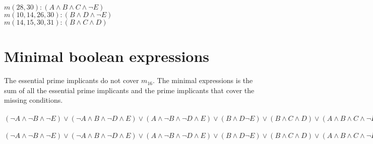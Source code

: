 \documentclass{article}
\begin{document}
    $m(28,30) : (A \land B  \land C \land \neg E)$\\

    $m(10, 14, 26, 30) : (B \land D \land \neg E)$\\
    
    $m(14, 15, 30, 31) : (B \land C \land D)$\\

    \section{\textbf{Minimal boolean expressions}}
    
    The  essential prime implicants do not cover $m_{16}$. The minimal expressions is the sum of all the essential prime implicants and the prime implicants that cover the missing conditions.\\
	\\
    $(\neg A \land \neg B \land \neg E) \lor (\neg A \land B \land \neg D \land E) \lor (A \land \neg B \land \neg D \land E) \lor (B \land D \neg E) \lor (B \land C \land D) \lor (A \land B \land C \land \neg E) \lor (\neg B \land \neg C \land \neg D \land \neg E)$\\
    \\
    $(\neg A \land \neg B \land \neg E) \lor (\neg A \land B \land \neg D \land E) \lor (A \land \neg B \land \neg D \land E) \lor (B \land D \neg E) \lor (B \land C \land D) \lor (A \land B \land C \land \neg E) \lor (A \land \neg B \land \neg C \land \neg D)$
\end{document}
